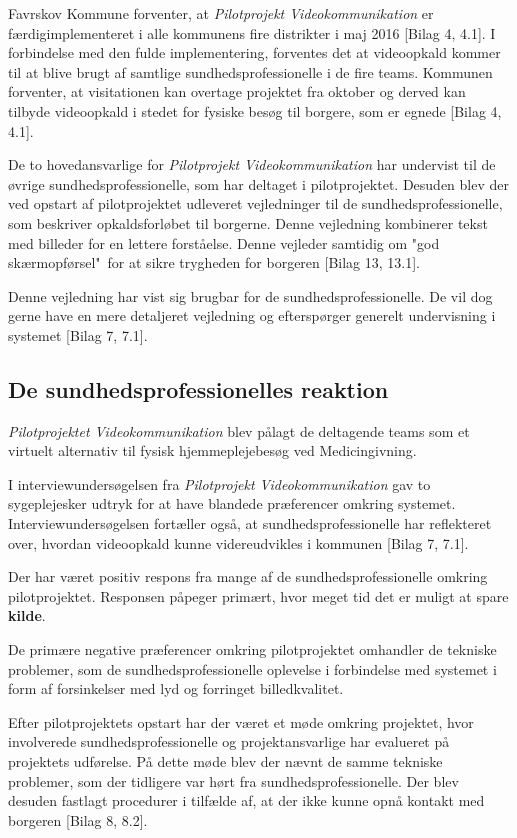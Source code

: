 Favrskov Kommune forventer, at \textit{Pilotprojekt Videokommunikation} er færdigimplementeret i alle kommunens fire distrikter i maj 2016 [Bilag 4, 4.1]. I forbindelse med den fulde implementering, forventes det at videoopkald kommer til at blive brugt af samtlige sundhedsprofessionelle i de fire teams. Kommunen forventer, at visitationen kan overtage projektet fra oktober og derved kan tilbyde videoopkald i stedet for fysiske besøg til borgere, som er egnede [Bilag 4, 4.1].

De to hovedansvarlige for \textit{Pilotprojekt Videokommunikation} har undervist til de øvrige sundhedsprofessionelle, som har deltaget i pilotprojektet. Desuden blev der ved opstart af pilotprojektet udleveret vejledninger til de sundhedsprofessionelle, som beskriver opkaldsforløbet til borgerne. Denne vejledning kombinerer tekst med billeder for en lettere forståelse. Denne vejleder samtidig om "god skærmopførsel"\ for at sikre trygheden for borgeren [Bilag 13, 13.1].  

Denne vejledning har vist sig brugbar for de sundhedsprofessionelle. De vil dog gerne have en mere detaljeret vejledning og efterspørger generelt undervisning i systemet [Bilag 7, 7.1].

 
\subsection{De sundhedsprofessionelles reaktion}
\textit{Pilotprojektet Videokommunikation} blev pålagt de deltagende teams som et virtuelt alternativ til fysisk hjemmeplejebesøg ved Medicingivning. 

I interviewundersøgelsen fra \textit{Pilotprojekt Videokommunikation} gav to sygeplejesker udtryk for at have blandede præferencer omkring systemet. Interviewundersøgelsen fortæller også, at sundhedsprofessionelle har reflekteret over, hvordan videoopkald kunne videreudvikles i kommunen [Bilag 7, 7.1]. 

Der har været positiv respons fra mange af de sundhedsprofessionelle omkring pilotprojektet. Responsen påpeger primært, hvor meget tid det er muligt at spare \textbf{kilde}.

De primære negative præferencer omkring pilotprojektet omhandler de tekniske problemer, som de sundhedsprofessionelle oplevelse i forbindelse med systemet i form af forsinkelser med lyd og forringet billedkvalitet. 

Efter pilotprojektets opstart har der været et møde omkring projektet, hvor involverede sundhedsprofessionelle og projektansvarlige har evalueret på projektets udførelse. På dette møde blev der nævnt de samme tekniske problemer, som der tidligere var hørt fra sundhedsprofessionelle. Der blev desuden fastlagt procedurer i tilfælde af, at der ikke kunne opnå kontakt med borgeren [Bilag 8, 8.2]. 

